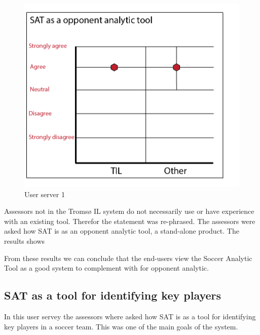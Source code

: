 \begin{figure}[ht!]
\centering
\includegraphics[width=1\textwidth]{images/evaluation/user_servery1}
\caption{User server 1}
\label{fig:user_servery1}
\end{figure}

Assessors not in the Tromsø IL system do not necessarily use or have experience with an existing tool. Therefor the statement was re-phrased. The assessors were asked how SAT is as an opponent analytic tool, a stand-alone product. The results shows

From these results we can conclude that the end-users view the Soccer Analytic Tool as a good system to complement with for opponent analytic.

\subsection{SAT as a tool for identifying key players}

In this user servey the assessors where asked how SAT is as a tool for identifying key players in a soccer team. This was one of the main goals of the system. 


